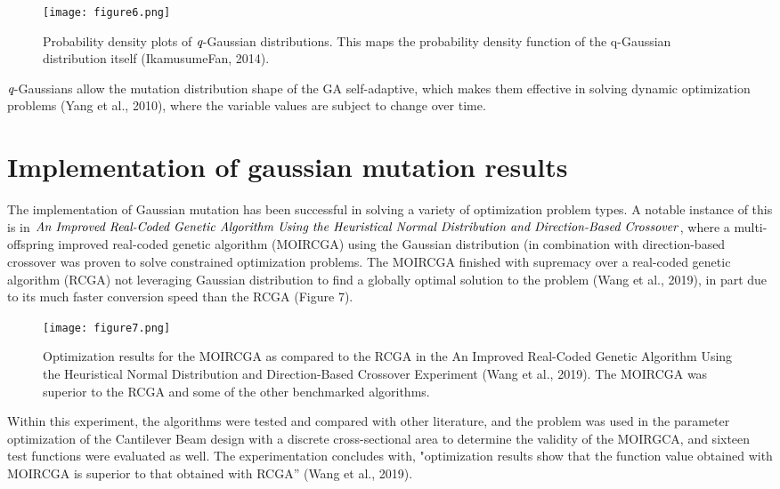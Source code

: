 \documentclass{JMLFS}
\begin{document}
\begin{figure}[ht]
\centering
\texttt{[image: figure6.png]}
\caption{Probability density plots of $\emph{q}$-Gaussian distributions. This maps the probability density function of the q-Gaussian distribution itself (IkamusumeFan, 2014).}
\end{figure}

$\emph{q}$-Gaussians allow the mutation distribution shape of the GA self-adaptive, which makes them effective in solving dynamic optimization problems (Yang et al., 2010), where the variable values are subject to change over time.

\section{Implementation of gaussian mutation results}
The implementation of Gaussian mutation has been successful in solving a variety of optimization problem types. A notable instance of this is in $\emph {An Improved Real-Coded Genetic Algorithm Using the Heuristical Normal Distribution and Direction-Based Crossover}$, where a multi-offspring improved real-coded genetic algorithm (MOIRCGA) using the Gaussian distribution (in combination with direction-based crossover was proven to solve constrained optimization problems. The MOIRCGA finished with supremacy over a real-coded genetic algorithm (RCGA) not leveraging Gaussian distribution to find a globally optimal solution to the problem (Wang et al., 2019), in part due to its much faster conversion speed than the RCGA (Figure 7).
\begin{figure}[ht]
\centering
\texttt{[image: figure7.png]}
\caption{Optimization results for the MOIRCGA as compared to the RCGA in the  An Improved Real-Coded Genetic Algorithm Using the Heuristical Normal Distribution and Direction-Based Crossover Experiment (Wang et al., 2019). The MOIRCGA was superior to the RCGA and some of the other benchmarked algorithms.}
\end{figure} 

\noindent Within this experiment, the algorithms were tested and compared with other literature, and the problem was used in the parameter optimization of the Cantilever Beam design with a discrete cross-sectional area to determine the validity of the MOIRGCA, and sixteen test functions were evaluated as well. The experimentation concludes with, "optimization results show that the function value obtained with MOIRCGA is superior to that obtained with RCGA'' (Wang et al., 2019).
\end{document}
